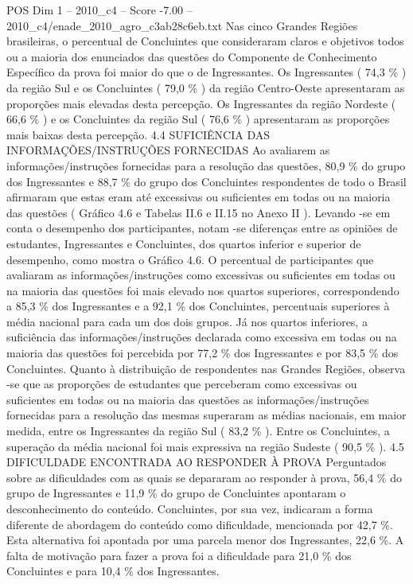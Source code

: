 \begin{textsample}{POS Dim 1 – 2010\_c4 – Score -7.00 – 2010\_c4/enade\_2010\_agro\_c3ab28c6eb.txt}
Nas cinco Grandes Regiões brasileiras, o percentual de Concluintes que consideraram claros e objetivos todos ou a maioria dos enunciados das questões do Componente de Conhecimento Específico da prova foi maior do que o de Ingressantes.
Os Ingressantes ( 74,3 \% ) da região Sul e os Concluintes ( 79,0 \% ) da região Centro-Oeste apresentaram as proporções mais elevadas desta percepção.
Os Ingressantes da região Nordeste ( 66,6 \% ) e os Concluintes da região Sul ( 76,6 \% ) apresentaram as proporções mais baixas desta percepção. 4.4 SUFICIÊNCIA DAS INFORMAÇÕES/INSTRUÇÕES FORNECIDAS Ao avaliarem as informações/instruções fornecidas para a resolução das questões, 80,9 \% do grupo dos Ingressantes e 88,7 \% do grupo dos Concluintes respondentes de todo o Brasil afirmaram que estas eram até excessivas ou suficientes em todas ou na maioria das questões ( Gráfico 4.6 e Tabelas II.6 e II.15 no Anexo II ).
Levando -se em conta o desempenho dos participantes, notam -se diferenças entre as opiniões de estudantes, Ingressantes e Concluintes, dos quartos inferior e superior de desempenho, como mostra o Gráfico 4.6.
O percentual de participantes que avaliaram as informações/instruções como excessivas ou suficientes em todas ou na maioria das questões foi mais elevado nos quartos superiores, correspondendo a 85,3 \% dos Ingressantes e a 92,1 \% dos Concluintes, percentuais superiores à média nacional para cada um dos dois grupos.
Já nos quartos inferiores, a suficiência das informações/instruções declarada como excessiva em todas ou na maioria das questões foi percebida por 77,2 \% dos Ingressantes e por 83,5 \% dos Concluintes.
Quanto à distribuição de respondentes nas Grandes Regiões, observa -se que as proporções de estudantes que perceberam como excessivas ou suficientes em todas ou na maioria das questões as informações/instruções fornecidas para a resolução das mesmas superaram as médias nacionais, em maior medida, entre os Ingressantes da região Sul ( 83,2 \% ).
Entre os Concluintes, a superação da média nacional foi mais expressiva na região Sudeste ( 90,5 \% ). 4.5 DIFICULDADE ENCONTRADA AO RESPONDER À PROVA Perguntados sobre as dificuldades com as quais se depararam ao responder à prova, 56,4 \% do grupo de Ingressantes e 11,9 \% do grupo de Concluintes apontaram o desconhecimento do conteúdo.
Concluintes, por sua vez, indicaram a forma diferente de abordagem do conteúdo como dificuldade, mencionada por 42,7 \%.
Esta alternativa foi apontada por uma parcela menor dos Ingressantes, 22,6 \%.
A falta de motivação para fazer a prova foi a dificuldade para 21,0 \% dos Concluintes e para 10,4 \% dos Ingressantes.

\end{textsample}
